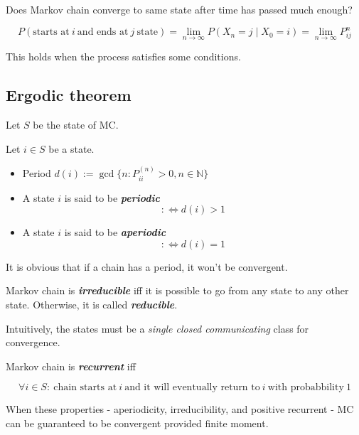 \documentclass[]{book}
\theoremstyle{definition}
\theoremstyle{definition}
\theoremstyle{definition}
\theoremstyle{remark}
\let\BeginKnitrBlock\begin \let\EndKnitrBlock\end
\begin{document}
Does Markov chain converge to same state after time has passed much enough?

\[P(\text{starts at}\: i \: \text{and ends at}\: j \: \text{state}) = \lim_{n \rightarrow \infty} P(X_n = j \mid X_0 = i) = \lim_{n \rightarrow \infty} P_{ij}^n\]

This holds when the process satisfies some conditions.

\hypertarget{ergodic-theorem}{%
\subsection{Ergodic theorem}\label{ergodic-theorem}}

Let \(S\) be the state of MC.

\BeginKnitrBlock{definition}[Aperiodicity]
\protect\hypertarget{def:mcperiod}{}{\label{def:mcperiod} {} }Let \(i \in S\) be a state.

\begin{itemize}
  \item Period $d(i) := \gcd \{ n : P_{ii}^(n) > 0, n \in \mathbb{N} \}$
  \item A state $i$ is said to be \textbf{\textit{periodic}} $$: \Leftrightarrow d(i) > 1$$
  \item A state $i$ is said to be \textbf{\textit{aperiodic}} $$: \Leftrightarrow d(i) = 1$$
\end{itemize}
\EndKnitrBlock{definition}

It is obvious that if a chain has a period, it won't be convergent.

\BeginKnitrBlock{definition}[Irreducibility]
\protect\hypertarget{def:mcreduc}{}{\label{def:mcreduc} {} }Markov chain is \textbf{\textit{irreducible}} iff it is possible to go from any state to any other state. Otherwise, it is called \textbf{\textit{reducible}}.
\EndKnitrBlock{definition}

Intuitively, the states must be a \emph{single closed communicating} class for convergence.

\BeginKnitrBlock{definition}[Positive recurrence]
\protect\hypertarget{def:mcrecc}{}{\label{def:mcrecc} {} }Markov chain is \textbf{\textit{recurrent}} iff

\[\forall i \in S : \: \text{chain starts at}\: i \: \text{and it will eventually return to}\: i \: \text{with probabbility}\: 1\]
\EndKnitrBlock{definition}

When these properties - aperiodicity, irreducibility, and positive recurrent - MC can be guaranteed to be convergent provided finite moment.
\end{document}
